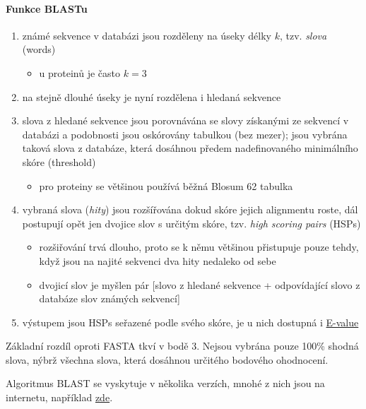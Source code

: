 \documentclass[DIV=8]{scrreprt}
\begin{document}
\paragraph{Funkce BLASTu}
\begin{enumerate}[nosep]
    \item známé sekvence v databázi jsou rozděleny na úseky délky \(k\), tzv. \emph{slova} (words)
\begin{itemize}[nosep]
    \item u proteinů je často \(k = 3\)
\end{itemize}

    \item na stejně dlouhé úseky je nyní rozdělena i hledaná sekvence
    \item slova z hledané sekvence jsou porovnávána se slovy získanými ze sekvencí v databázi a podobnosti jsou oskórovány tabulkou (bez mezer); jsou vybrána taková slova z databáze, která dosáhnou předem nadefinovaného minimálního skóre (threshold)
\begin{itemize}[nosep]
    \item pro proteiny se většinou používá běžná Blosum 62 tabulka
\end{itemize}

    \item vybraná slova (\emph{hity}) jsou rozšířována dokud skóre jejich alignmentu roste, dál postupují opět jen dvojice slov s určitým skóre, tzv. \emph{high scoring pairs} (HSPs)
\begin{itemize}[nosep]
    \item rozšiřování trvá dlouho, proto se k němu většinou přistupuje pouze tehdy, když jsou na najité sekvenci dva hity nedaleko od sebe
    \item dvojicí slov je myšlen pár [slovo z hledané sekvence + odpovídající slovo z databáze slov známých sekvencí]
\end{itemize}

    \item výstupem jsou HSPs seřazené podle svého skóre, je u nich dostupná i \hyperref[Parametry významnosti alignmentu]{E-value}
\end{enumerate}



Základní rozdíl oproti FASTA tkví v bodě 3. Nejsou vybrána pouze 100\% shodná slova, nýbrž všechna slova, která dosáhnou určitého bodového ohodnocení.

Algoritmus BLAST se vyskytuje v několika verzích, mnohé z nich jsou na internetu, například \href{https://blast.ncbi.nlm.nih.gov/Blast.cgi}{zde}.
\end{document}
